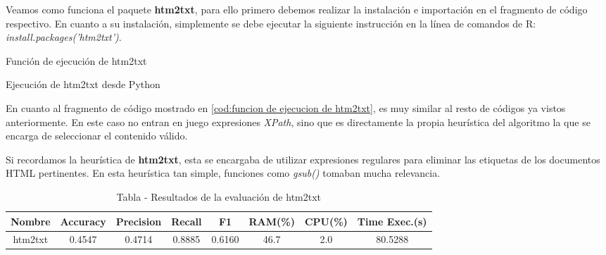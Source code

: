 Veamos como funciona el paquete \textbf{htm2txt}, para ello primero debemos realizar la instalación e
importación en el fragmento de código respectivo. En cuanto a su instalación, simplemente se debe ejecutar
la siguiente instrucción en la línea de comandos de R: \emph{install.packages('htm2txt')}.

\begin{codefloat}
    
    \caption{Función de ejecución de htm2txt}
    \label{cod:funcion de ejecucion de htm2txt}
\end{codefloat}

\begin{codefloat}
    
    \caption{Ejecución de htm2txt desde Python}
    \label{cod:ejecucion de htm2txt desde python}
\end{codefloat}

En cuanto al fragmento de código mostrado en \ref{cod:funcion de ejecucion de htm2txt}, es muy similar al
resto de códigos ya vistos anteriormente. En este caso no entran en juego expresiones \emph{XPath}, sino
que es directamente la propia heurística del algoritmo la que se encarga de seleccionar el contenido válido.

Si recordamos la heurística de \textbf{htm2txt}, esta se encargaba de utilizar expresiones regulares para
eliminar las etiquetas de los documentos HTML pertinentes. En esta heurística tan simple, funciones como 
\emph{gsub()} tomaban mucha relevancia.

\begin{table}[h]
    \begin{center}
      \begin{tabular}{| c | c | c | c | c | c | c | c |} \hline 
       \textbf{Nombre} & \textbf{Accuracy} & \textbf{Precision}  & \textbf{Recall} & \textbf{F1} & \textbf{RAM(\%)} & \textbf{CPU(\%)} & \textbf{Time Exec.(s)} \\ \hline
       htm2txt & 0.4547 & 0.4714 & 0.8885 & 0.6160 & 46.7 & 2.0 & 80.5288 \\ \hline
      \end{tabular}
      \caption{Tabla - Resultados de la evaluación de htm2txt}
      \label{tab:tabla - resultados de la evaluacion de htm2txt}
    \end{center}
\end{table}

